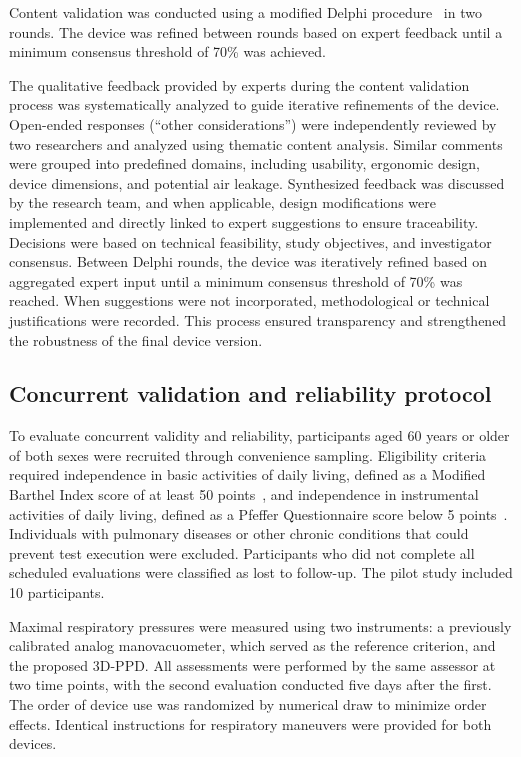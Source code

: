 \documentclass{ieeeaccess}
\begin{document}
Content validation was conducted using a modified Delphi procedure~\cite{Souza2017,Yusoff2019} in two rounds. The device was refined between rounds based on expert feedback until a minimum consensus threshold of 70\% was achieved.

{The qualitative feedback provided by experts during the content validation process was systematically analyzed to guide iterative refinements of the device. Open-ended responses (“other considerations”) were independently reviewed by two researchers and analyzed using thematic content analysis. Similar comments were grouped into predefined domains, including usability, ergonomic design, device dimensions, and potential air leakage. Synthesized feedback was discussed by the research team, and when applicable, design modifications were implemented and directly linked to expert suggestions to ensure traceability. Decisions were based on technical feasibility, study objectives, and investigator consensus. Between Delphi rounds, the device was iteratively refined based on aggregated expert input until a minimum consensus threshold of 70\% was reached. When suggestions were not incorporated, methodological or technical justifications were recorded. This process ensured transparency and strengthened the robustness of the final device version.}

\subsection{Concurrent validation and reliability protocol}

To evaluate concurrent validity and reliability, participants aged 60 years or older of both sexes were recruited through convenience sampling. Eligibility criteria required independence in basic activities of daily living, defined as a Modified Barthel Index score of at least 50 points~\cite{Wang2022Comparison}, and independence in instrumental activities of daily living, defined as a Pfeffer Questionnaire score below 5 points~\cite{Dutra2015}. Individuals with pulmonary diseases or other chronic conditions that could prevent test execution were excluded. Participants who did not complete all scheduled evaluations were classified as lost to follow-up. The pilot study included 10 participants.

Maximal respiratory pressures were measured using two instruments: a previously calibrated analog manovacuometer, which served as the reference criterion, and the proposed 3D-PPD. All assessments were performed by the same assessor at two time points, with the second evaluation conducted five days after the first. The order of device use was randomized by numerical draw to minimize order effects. Identical instructions for respiratory maneuvers were provided for both devices.
\end{document}
